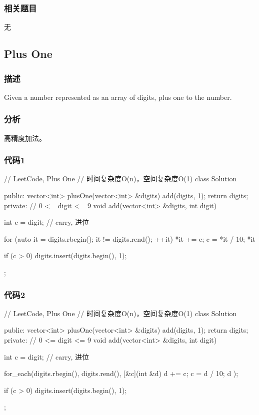 \subsubsection{相关题目}
\begindot
\item 无
\myenddot


\subsection{Plus One} %
\label{sec:plus-one}


\subsubsection{描述}
Given a number represented as an array of digits, plus one to the number.


\subsubsection{分析}
高精度加法。


\subsubsection{代码1}
\begin{Code}
// LeetCode, Plus One
// 时间复杂度O(n)，空间复杂度O(1)
class Solution {
public:
    vector<int> plusOne(vector<int> &digits) {
        add(digits, 1);
        return digits;
    }
private:
    // 0 <= digit <= 9
    void add(vector<int> &digits, int digit) {
        int c = digit;  // carry, 进位

        for (auto it = digits.rbegin(); it != digits.rend(); ++it) {
            *it += c;
            c = *it / 10;
            *it %
        }

        if (c > 0) digits.insert(digits.begin(), 1);
    }
};
\end{Code}


\subsubsection{代码2}
\begin{Code}
// LeetCode, Plus One
// 时间复杂度O(n)，空间复杂度O(1)
class Solution {
public:
    vector<int> plusOne(vector<int> &digits) {
        add(digits, 1);
        return digits;
    }
private:
    // 0 <= digit <= 9
    void add(vector<int> &digits, int digit) {
        int c = digit;  // carry, 进位

        for_each(digits.rbegin(), digits.rend(), [&c](int &d){
            d += c;
            c = d / 10;
            d %
        });

        if (c > 0) digits.insert(digits.begin(), 1);
    }
};
\end{Code}


